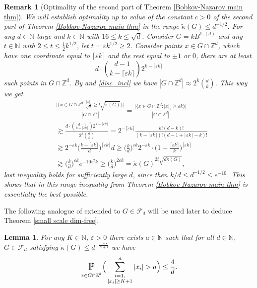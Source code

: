 \documentclass[10pt,a4paper]{amsart}
\numberwithin{equation}{section}
\newtheorem{Lem}[Thm]{Lemma}
\newtheorem{Rem}[Thm]{Remark}
\newcommand{\Pro}{\mathop{\mathbb{P}}}
\newcommand{\Z}{\mathbb{Z}}
\newcommand{\N}{\mathbb{N}}
\newcommand{\spr}[1]{\underset{_{\substack{#1}}}{\mathlarger{\mathlarger{\Pro}}}}
\begin{document}
\begin{Rem}[Optimality of the second part of Theorem \ref{Bobkov-Nazarov main thm}] \label{optimality of small scale Bobkov-Nazarov} We will establish optimality up to value of the constant $c>0$ of the second part of Theorem \ref{Bobkov-Nazarov main thm} in the range $\widetilde{\kappa}(G) \le d^{-1/2}$.  For any $d \in \N$ large and $k \in \N$ with $16 \le k \le \sqrt{d}$. Consider $G=kB^{1,(d)}$ and any $t \in \N$ with $2 \le t \le  \frac{1}{2} k^{1/2}$, let $t= \varepsilon k^{1/2} \ge 2$. Consider points $x \in G \cap \Z^d$, which have one coordinate equal to $\lceil \varepsilon k \rceil$ and the rest equal to $\pm 1$ or $0$, there are at least 
\[
d \cdot \binom{d-1}{k-\lceil \varepsilon k \rceil} 2^{k-\lceil \varepsilon k \rceil}
\]
such points in $G \cap \Z^d$. By \cite[Corollary 1.8]{KNW} and \eqref{disc_incl} we have $|G \cap \Z^d| \approx 2^k \binom{d}{k}$. This way we get 
\begin{align*}
    &\frac{\Big|\Big\{ x \in G \cap \Z^d: \frac{|x|_2}{\sqrt{d}} \ge t \sqrt{\widetilde{\kappa}(G) } \Big\} \Big|}{|G \cap \Z^d|} = \frac{\Big|\Big\{ x \in G \cap \Z^d: |x|_2 \ge \varepsilon k \Big\} \Big|}{|G \cap \Z^d|} \\
    & \gtrsim \frac{d \cdot \binom{d-1}{k-\lceil \varepsilon k \rceil} 2^{k-\lceil \varepsilon k \rceil}}{2^k \binom{d}{k}}= 2^{- \lceil \varepsilon k \rceil} \frac{ k!(d-k)!}{(k-\lceil \varepsilon k \rceil)! (d-1+ \lceil \varepsilon k \rceil-k)!} \\
    &\gtrsim 2^{-\varepsilon k}\Big( \frac{k-\lceil \varepsilon k \rceil}{d} \Big)^{\lceil \varepsilon k \rceil} d \ge \Big( \frac{k}{d} \Big)^{\varepsilon k} 2^{-\varepsilon k } \cdot \Big(1- \frac{\lceil \varepsilon k \rceil}{k} \Big)^{\lceil \varepsilon k \rceil} \\
    &\gtrsim  \Big(\frac{k}{d} \Big)^{\varepsilon k} e^{-10 \varepsilon^2 k} \ge \Big( \frac{k}{d} \Big)^{ 2\varepsilon k}= \widetilde{\kappa}(G)^{2t \sqrt{d \widetilde{\kappa}(G)}},
\end{align*}
    last inequality holds for sufficiently large $d$, since then $k/d \le d^{-1/2} \le e^{-10}$. This shows that in this range inequality from Theorem \ref{Bobkov-Nazarov main thm} is essentially the best possible. 
\end{Rem}
The following analogue of \cite[Theorem 3.1]{NW} extended to $G \in \mathcal{F}_d$ will be used later to deduce
Theorem \ref{small scale dim-free}. 
\begin{Lem} \label{fun fact for sup sym conv body}
For any $K \in \N$, $\varepsilon>0$ there exists $a \in \N$ such that 
for all $d \in \N$, $G \in \mathcal{F}_d$ satisfying $\widetilde{\kappa}(G) \le d^{-\frac{1+\varepsilon}{K+1}}$ we have 
\[
\spr{x \in G \cap \Z^d} \Big(\sum_{\substack{i=1, \\ |x_i| \ge K+1}}^d
|x_i| > a \Big) \le \frac{4}{d}.
\]
\end{Lem}
\end{document}
